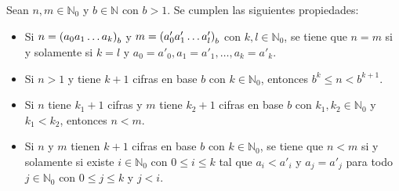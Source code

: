 \begin{proposition}
  \rm Sean $n,m\in\mathbb{N}_0$ y $b\in\mathbb{N}$ con $b>1$. Se cumplen las siguientes propiedades:

  \begin{itemize}
    \item[1.] Si $n=\left(a_0a_1\dots a_k\right)_b$ y $m=\left(a'_0a'_1\dots a'_l\right)_b$ con $k,l\in\mathbb{N}_0$, se tiene que $n=m$ si y solamente si $k=l$ y $a_0=a'_0,a_1=a'_1,\dots,a_k=a'_k$.
    \item[2.] Si $n>1$ y tiene $k+1$ cifras en base $b$ con $k\in\mathbb{N}_0$, entonces $b^k\leq n<b^{k+1}$. 
    \item[3.] Si $n$ tiene $k_1+1$ cifras y $m$ tiene $k_2+1$ cifras en base $b$ con $k_1,k_2\in\mathbb{N}_0$ y $k_1<k_2$, entonces $n<m$.
    \item[4.] Si $n$ y $m$ tienen $k+1$ cifras en base $b$ con $k\in\mathbb{N}_0$, se tiene que $n<m$ si y solamente si existe $i\in\mathbb{N}_0$ con $0\leq i\leq k$ tal que $a_i<a'_i$ y $a_j=a'_j$ para todo $j\in\mathbb{N}_0$ con $0\leq j\leq k$ y $j<i$.
  \end{itemize}
\end{proposition}